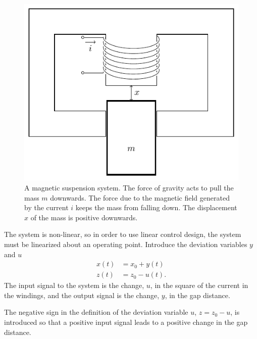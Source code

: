 \documentclass[letterpaper,12pt]{scrartcl}
\begin{document}
\begin{figure}[htb]
\begin{center}
\includegraphics[width=0.5\linewidth]{../figures/magnetic-suspension}
\caption{A magnetic suspension system. The force of gravity acts to pull the mass $m$ downwards. The force due to the magnetic field generated by the current $i$ keeps the mass from falling down. The displacement $x$ of the mass is positive downwards.}
\label{fig:magnetic-suspension} 
\end{center}
\end{figure}
The system is non-linear, so in order to use linear control design, the system must be linearized about an operating point. Introduce the deviation variables \(y\) and \(u\)
\begin{align*}
x(t) &= x_0 + y(t) \\
z(t) &= z_0 - u(t).
\end{align*}
The input signal to the system is the change, $u$, in the square of the current in the windings, and the output signal is the change, \(y\),  in the gap distance. 
\begin{center}
\end{center}
The negative sign in the definition of the deviation variable $u$,  \(z = z_0 - u\), is introduced so that a positive input signal leads to a positive change in the gap distance.
\end{document}
